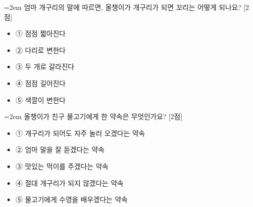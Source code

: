 \documentclass[12pt,a4paper]{article}
\newcommand{\qnum}[1]{%
  \tikz[baseline=(num.base)]{%
    \node[circle, fill=numCircle, text=white, inner sep=0pt,
          minimum size=18pt, font=\small\bfseries] (num) {#1};%
  }%
}
\newcommand{\pts}[1]{%
  \hfill\textcolor{ptsBadge}{[#1점]}%
}
\begin{document}
\vspace{4mm}
\begin{samepage}
{\hangindent=2em
\qnum{7}\enspace 엄마 개구리의 말에 따르면, 올챙이가 개구리가 되면 꼬리는 어떻게 되나요? \pts{2}
\par}

\vspace{3mm}
\begin{itemize}[leftmargin=2.5em, labelsep=0.3em, label={}, itemsep=4pt, parsep=1pt, topsep=0pt]
  \item ① 점점 짧아진다
  \item ② 다리로 변한다
  \item ③ 두 개로 갈라진다
  \item ④ 점점 길어진다
  \item ⑤ 색깔이 변한다
\end{itemize}
\end{samepage}

\vspace{4mm}
\begin{samepage}
{\hangindent=2em
\qnum{8}\enspace 올챙이가 친구 물고기에게 한 약속은 무엇인가요? \pts{2}
\par}

\vspace{3mm}
\begin{itemize}[leftmargin=2.5em, labelsep=0.3em, label={}, itemsep=4pt, parsep=1pt, topsep=0pt]
  \item ① 개구리가 되어도 자주 놀러 오겠다는 약속
  \item ② 엄마 말을 잘 듣겠다는 약속
  \item ③ 맛있는 먹이를 주겠다는 약속
  \item ④ 절대 개구리가 되지 않겠다는 약속
  \item ⑤ 물고기에게 수영을 배우겠다는 약속
\end{itemize}
\end{samepage}
\end{document}
